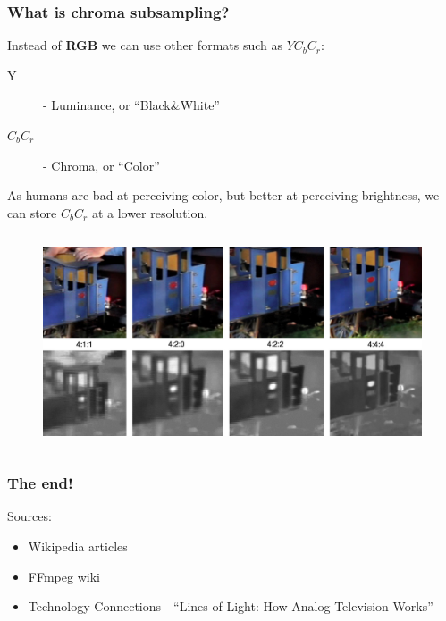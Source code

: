 \documentclass[aspectratio=169]{beamer}
\begin{document}
\begin{frame}
    \frametitle{What is chroma subsampling?}
    Instead of \textbf{RGB} we can use other formats such as \textbf{$YC_bC_r$}:
    \begin{description}
        \item[Y] - Luminance, or ``Black\&White''
        \item[$C_bC_r$] - Chroma, or ``Color''
    \end{description}
    \pause
    As humans are bad at perceiving color, but better at perceiving brightness, we can store $C_bC_r$ at a lower resolution.
    \pause
    \begin{columns}
        \begin{column}{.55\textwidth}
            \begin{figure}
                \includegraphics[width=\textwidth]{ycbcr.jpg}
                \centering
            \end{figure}
        \end{column}
    \end{columns}
\end{frame}

\begin{frame}
    \frametitle{The end!}
    Sources:
    \begin{itemize}
        \item Wikipedia articles
        \item FFmpeg wiki
        \item Technology Connections - ``Lines of Light: How Analog Television Works''
    \end{itemize}
\end{frame}
\end{document}
